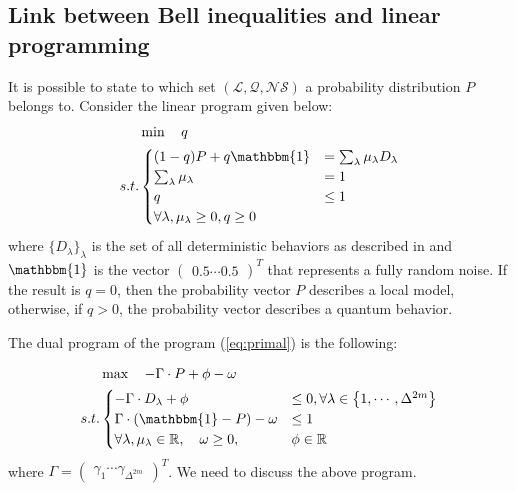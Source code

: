 \documentclass[12pt]{article}
\renewcommand{\L}{\mathcal{L}}
\newcommand{\NS}{\mathcal{NS}}
\newcommand{\Q}{\mathcal{Q}}
\begin{document}
\begin{multicols}{2}

\section*{Link between Bell inequalities and linear programming}
It is possible to state to which set $( \L, \Q, \NS )$ a probability distribution $P$ belongs to.
Consider the linear program given below:
\begin{equation} \label{eq:primal}
	\begin{aligned}
			 & \min \quad q \\
		s.t. &
		\begin{cases}
			(1-q) P + q \mathbbm{1}  & = \sum_\lambda \mu_\lambda D_\lambda \\
			\sum_\lambda \mu_\lambda & = 1 \\
			q & \leq 1 \\
			\forall \lambda, \mu_\lambda \geq 0, q \geq 0
		\end{cases}
	\end{aligned}
\end{equation}
where $\{D_\lambda\}_\lambda$ is the set of all deterministic behaviors as
described in \cite{2014-bell-nonlocality} and $\mathbbm{1}$ is the vector
$\begin{pmatrix} 0.5 \cdots 0.5 \end{pmatrix}^T$ that represents a fully random
noise. If the result is $q = 0$, then the probability vector $P$ describes a
local model, otherwise, if $q > 0$, the probability vector describes a quantum
behavior.

The dual program of the program (\ref{eq:primal}) is the following:

\begin{equation} \label{eq:dual}
	\begin{aligned}
 			 & \max \quad -\Gamma \cdot P + \phi - \omega \\
		s.t. &
		\begin{cases}
			- \Gamma \cdot D_\lambda + \phi & \leq 0, \forall \lambda \in \big\{1, \cdots, \Delta^{2m}\big\} \\
			\Gamma \cdot (\mathbbm{1} - P) - \omega & \leq 1 \\
			\forall \lambda, \mu_\lambda \in \mathbb{R}, \quad \omega \geq 0,  & \phi \in \mathbb{R}
		\end{cases}
	\end{aligned}
\end{equation}
where $\Gamma = \begin{pmatrix} \gamma_1 \cdots \gamma_{\Delta^{2m}}
\end{pmatrix}^T$. We need to discuss the above program.


\end{multicols}
\end{document}
